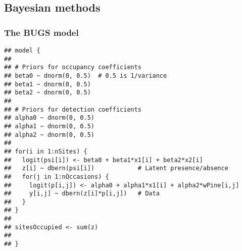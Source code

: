 \documentclass[color=usenames,dvipsnames]{beamer}\usepackage[]{graphicx}\usepackage[]{color}
\makeatletter
\newenvironment{kframe}{%
 \def\at@end@of@kframe{}%
 \ifinner\ifhmode%
  \def\at@end@of@kframe{\end{minipage}}%
  \begin{minipage}{\columnwidth}%
 \fi\fi%
 \def\FrameCommand##1{\hskip\@totalleftmargin \hskip-\fboxsep
 \colorbox{shadecolor}{##1}\hskip-\fboxsep
     \hskip-\linewidth \hskip-\@totalleftmargin \hskip\columnwidth}%
 \MakeFramed {\advance\hsize-\width
   \@totalleftmargin\z@ \linewidth\hsize
   \@setminipage}}%
 {\par\unskip\endMakeFramed%
 \at@end@of@kframe}
\newenvironment{knitrout}{}{} %
\makeatother
\begin{document}



\subsection{Bayesian methods}



\begin{frame}[fragile]
  \frametitle{The BUGS model}
\begin{knitrout}\scriptsize
{}\color{fgcolor}\begin{kframe}
\begin{verbatim}
## model {
## 
## # Priors for occupancy coefficients
## beta0 ~ dnorm(0, 0.5)  # 0.5 is 1/variance
## beta1 ~ dnorm(0, 0.5)
## beta2 ~ dnorm(0, 0.5)
## 
## # Priors for detection coefficients
## alpha0 ~ dnorm(0, 0.5)  
## alpha1 ~ dnorm(0, 0.5)
## alpha2 ~ dnorm(0, 0.5)
## 
## for(i in 1:nSites) {
##   logit(psi[i]) <- beta0 + beta1*x1[i] + beta2*x2[i]
##   z[i] ~ dbern(psi[i])            # Latent presence/absence
##   for(j in 1:nOccasions) {
##     logit(p[i,j]) <- alpha0 + alpha1*x1[i] + alpha2*wPine[i,j]
##     y[i,j] ~ dbern(z[i]*p[i,j])   # Data
##   }
## }
## 
## sitesOccupied <- sum(z)
## 
## }
\end{verbatim}
\end{kframe}
\end{knitrout}
\end{frame}
\end{document}
